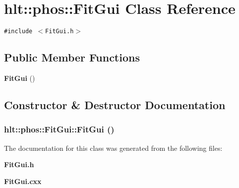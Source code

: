\section{hlt::phos::Fit\-Gui Class Reference}
\label{classhlt_1_1phos_1_1FitGui}
{\tt \#include $<$Fit\-Gui.h$>$}

\subsection*{Public Member Functions}
\begin{CompactItemize}
\item 
{\bf Fit\-Gui} ()
\end{CompactItemize}


\subsection{Constructor \& Destructor Documentation}
\subsubsection{\setlength{\rightskip}{0pt plus 5cm}hlt::phos::Fit\-Gui::Fit\-Gui ()}\label{classhlt_1_1phos_1_1FitGui_a0}




The documentation for this class was generated from the following files:\begin{CompactItemize}
\item 
{\bf Fit\-Gui.h}\item 
{\bf Fit\-Gui.cxx}\end{CompactItemize}
